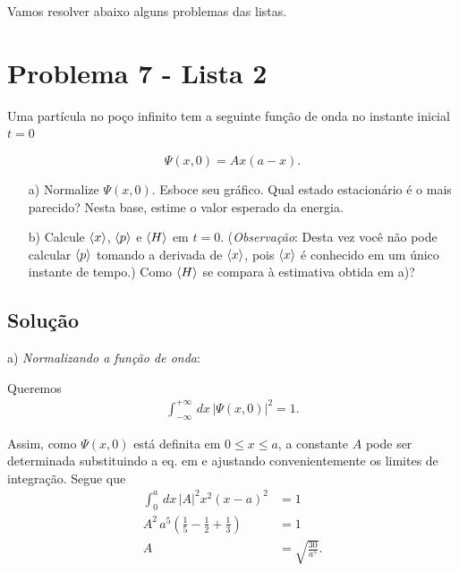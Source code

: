 \documentclass[red]{mecanica_quantica}
\begin{document}
 
\maketitle
\thispagestyle{fancy}
 
Vamos resolver abaixo alguns problemas das listas.
 
\section[]{Problema 7 - Lista 2}
 
Uma partícula no poço infinito tem a seguinte função de onda no instante inicial $t = 0$
	
	\begin{equation}
	\label{eq:Psit0}
	\Psi(x,0) = A x (a-x).
	\end{equation}


	\begin{itemize}
		\item[a)] Normalize $\Psi(x,0)$. Esboce seu gráfico. Qual estado estacionário é o mais parecido?
		Nesta base, estime o valor esperado da energia.
		\item[b)] Calcule $\langle x\rangle$, $\langle p\rangle$ e 
		$\langle H\rangle$ em $t=0$. (\emph{Observação}: Desta vez você não pode calcular $\langle p\rangle$ 
		tomando a derivada de $\langle x\rangle$, pois $\langle x\rangle$ é conhecido em um único instante de tempo.) 
		Como $\langle H\rangle$ se compara à estimativa obtida em a)?
	\end{itemize} 
 
\subsection{Solução}
	
	a) \emph{Normalizando a função de onda}:
	
	Queremos
	\begin{align}
	\label{eq:normPsi}
		\int_{-\infty}^{+\infty} \, dx \,  |\Psi(x,0)|^2 = 1.
	\end{align}
	
	Assim, como $\Psi(x,0)$ está definita em $ 0 \leq x \leq a$, a constante $A$ pode ser determinada substituindo a eq.  em  e ajustando convenientemente os limites de integração.
	Segue que
	\begin{align}
	\label{eq:normPsit0}
		\int_{0}^{a} \, dx \,  |A|^2 x^2 (x-a)^2 & = 1 \nonumber \\
		A^2  \, a^5 (\frac{1}{5}- \frac{1}{2} + \frac{1}{3}) & = 1 \nonumber \\ 
		A & = \sqrt{\frac{30}{a^5} }.
	\end{align}
\end{document}
